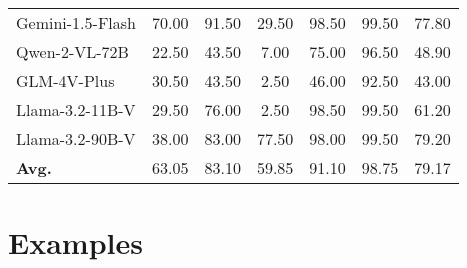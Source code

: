 \begin{table}[H]
\begin{tabular}{lcccccc}
Gemini-1.5-Flash  & 70.00                & 91.50                 & 29.50                 & 98.50                 & 99.50                 & 77.80                \\
Qwen-2-VL-72B     & 22.50                & 43.50                 & 7.00                  & 75.00                 & 96.50                 & 48.90                \\
GLM-4V-Plus       & 30.50                & 43.50                 & 2.50                  & 46.00                 & 92.50                 & 43.00                \\
Llama-3.2-11B-V   & 29.50                & 76.00                 & 2.50                  & 98.50                 & 99.50                 & 61.20                \\
Llama-3.2-90B-V   & 38.00                & 83.00                 & 77.50                 & 98.00                 & 99.50                 & 79.20                \\
\textbf{Avg.}     & 63.05                & 83.10                 & 59.85                 & 91.10                 & 98.75                 & 79.17                \\ \bottomrule[1pt]
\end{tabular}
\label{tab:vlm-jailbreak-results}
\vspace{-15pt}
\end{table}


\section{Examples}
